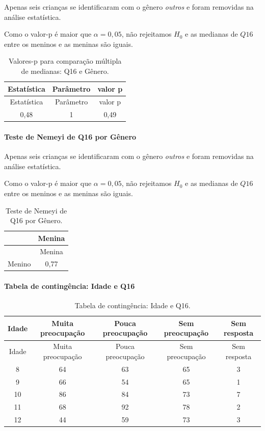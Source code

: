 \documentclass[]{article}
\let\oldparagraph\paragraph
\renewcommand{\paragraph}[1]{\oldparagraph{#1}\mbox{}}
\begin{document}
Apenas seis crianças se identificaram com o gênero \emph{outros} e foram removidas na análise estatística.

Como o valor-p é maior que \(\alpha=0,05\), não rejeitamos \(H_0\) e as medianas de \(Q16\) entre os meninos e as meninas são iguais.

\begin{longtable}[]{@{}ccc@{}}
\caption{\label{tab:unnamed-chunk-148}Valores-p para comparação múltipla de medianas: Q16 e Gênero.}\tabularnewline
\toprule
Estatística & Parâmetro & valor p\tabularnewline
\midrule
\endfirsthead
\toprule
Estatística & Parâmetro & valor p\tabularnewline
\midrule
\endhead
0,48 & 1 & 0,49\tabularnewline
\bottomrule
\end{longtable}

\hypertarget{teste-de-nemeyi-de-q16-por-guxeanero}{%
\paragraph{Teste de Nemeyi de Q16 por Gênero}\label{teste-de-nemeyi-de-q16-por-guxeanero}}

Apenas seis crianças se identificaram com o gênero \emph{outros} e foram removidas na análise estatística.

Como o valor-p é maior que \(\alpha=0,05\), não rejeitamos \(H_0\) e as medianas de \(Q16\) entre os meninos e as meninas são iguais.

\begin{longtable}[]{@{}lc@{}}
\caption{\label{tab:unnamed-chunk-149}Teste de Nemeyi de Q16 por Gênero.}\tabularnewline
\toprule
& Menina\tabularnewline
\midrule
\endfirsthead
\toprule
& Menina\tabularnewline
\midrule
\endhead
Menino & 0,77\tabularnewline
\bottomrule
\end{longtable}

\cleardoublepage

\hypertarget{tabela-de-continguxeancia-idade-e-q16}{%
\paragraph{Tabela de contingência: Idade e Q16}\label{tabela-de-continguxeancia-idade-e-q16}}

\begin{longtable}[]{@{}ccccc@{}}
\caption{\label{tab:unnamed-chunk-150}Tabela de contingência: Idade e Q16.}\tabularnewline
\toprule
Idade & Muita preocupação & Pouca preocupação & Sem preocupação & Sem resposta\tabularnewline
\midrule
\endfirsthead
\toprule
Idade & Muita preocupação & Pouca preocupação & Sem preocupação & Sem resposta\tabularnewline
\midrule
\endhead
8 & 64 & 63 & 65 & 3\tabularnewline
9 & 66 & 54 & 65 & 1\tabularnewline
10 & 86 & 84 & 73 & 7\tabularnewline
11 & 68 & 92 & 78 & 2\tabularnewline
12 & 44 & 59 & 73 & 3\tabularnewline
\bottomrule
\end{longtable}
\end{document}
